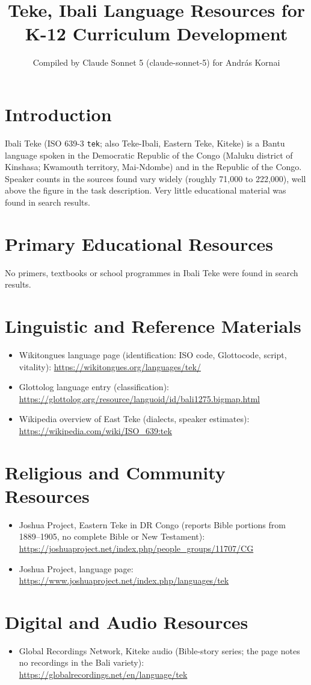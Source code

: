 \documentclass[12pt]{article}
\title{Teke, Ibali Language Resources for K-12 Curriculum Development}
\author{Compiled by Claude Sonnet 5 (claude-sonnet-5) for Andr\'as Kornai}
\date{}
\begin{document}
\maketitle
\section{Introduction}
Ibali Teke (ISO 639-3 \texttt{tek}; also Teke-Ibali, Eastern Teke, Kiteke) is a Bantu language spoken in the Democratic Republic of the Congo (Maluku district of Kinshasa; Kwamouth territory, Mai-Ndombe) and in the Republic of the Congo. Speaker counts in the sources found vary widely (roughly 71,000 to 222,000), well above the figure in the task description. Very little educational material was found in search results.
\section{Primary Educational Resources}
No primers, textbooks or school programmes in Ibali Teke were found in search results.
\section{Linguistic and Reference Materials}
\begin{itemize}
\item Wikitongues language page (identification: ISO code, Glottocode, script, vitality): \url{https://wikitongues.org/languages/tek/}
\item Glottolog language entry (classification): \url{https://glottolog.org/resource/languoid/id/bali1275.bigmap.html}
\item Wikipedia overview of East Teke (dialects, speaker estimates): \url{https://wikipedia.com/wiki/ISO_639:tek}
\end{itemize}
\section{Religious and Community Resources}
\begin{itemize}
\item Joshua Project, Eastern Teke in DR Congo (reports Bible portions from 1889--1905, no complete Bible or New Testament): \url{https://joshuaproject.net/index.php/people_groups/11707/CG}
\item Joshua Project, language page: \url{https://www.joshuaproject.net/index.php/languages/tek}
\end{itemize}
\section{Digital and Audio Resources}
\begin{itemize}
\item Global Recordings Network, Kiteke audio (Bible-story series; the page notes no recordings in the Bali variety): \url{https://globalrecordings.net/en/language/tek}
\end{itemize}
\end{document}
